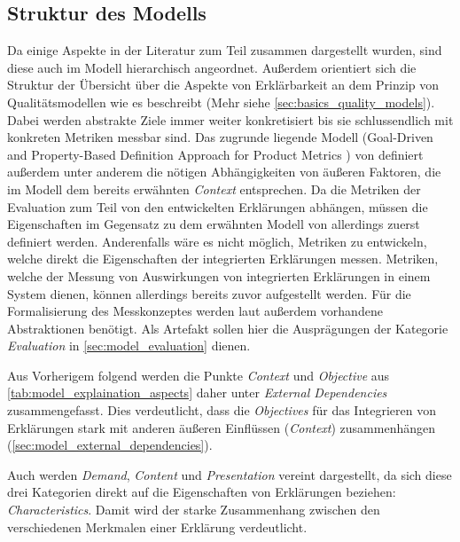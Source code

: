 \subsection{Struktur des Modells}

Da einige Aspekte in der Literatur zum Teil zusammen dargestellt wurden, sind diese auch im Modell hierarchisch angeordnet. Außerdem orientiert sich die Struktur der Übersicht über die Aspekte von Erklärbarkeit an dem Prinzip von Qualitätsmodellen wie es \citeauthor{schneider2012abenteuer} beschreibt \cite{schneider2012abenteuer} (Mehr siehe \autoref{sec:basics_quality_models}). Dabei werden abstrakte Ziele immer weiter konkretisiert bis sie schlussendlich mit konkreten Metriken messbar sind. Das zugrunde liegende Modell (\glqq Goal-Driven and Property-Based Definition Approach for Product Metrics\grqq{} \cite{briand1995goal}) von \citeauthor{briand1995goal} definiert außerdem unter anderem die nötigen Abhängigkeiten von äußeren Faktoren, die im Modell dem bereits erwähnten \textit{Context} entsprechen. Da die Metriken der Evaluation zum Teil von den entwickelten Erklärungen abhängen, müssen die Eigenschaften im Gegensatz zu dem erwähnten Modell von \citeauthor{schneider2012abenteuer} allerdings zuerst definiert werden. Anderenfalls wäre es nicht möglich, Metriken zu entwickeln, welche direkt die Eigenschaften der integrierten Erklärungen messen. Metriken, welche der Messung von Auswirkungen von integrierten Erklärungen in einem System dienen, können allerdings bereits zuvor aufgestellt werden. Für die Formalisierung des Messkonzeptes werden laut \citeauthor{briand1995goal} außerdem vorhandene Abstraktionen benötigt. Als Artefakt sollen hier die Ausprägungen der Kategorie \textit{Evaluation} in \autoref{sec:model_evaluation} dienen.

\smallbreak

Aus Vorherigem folgend werden die Punkte \textit{Context} und \textit{Objective} aus \autoref{tab:model_explaination_aspects} daher unter \textit{External Dependencies} zusammengefasst. Dies verdeutlicht, dass die \textit{Objectives} für das Integrieren von Erklärungen stark mit anderen äußeren Einflüssen (\textit{Context}) zusammenhängen (\autoref{sec:model_external_dependencies}).

Auch werden \textit{Demand}, \textit{Content} und \textit{Presentation} vereint dargestellt, da sich diese drei Kategorien direkt auf die Eigenschaften von Erklärungen beziehen: \textit{Characteristics}. Damit wird der starke Zusammenhang zwischen den verschiedenen Merkmalen einer Erklärung verdeutlicht.

